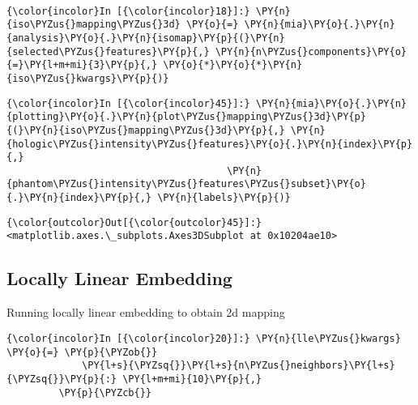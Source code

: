     \begin{center}
    \end{center}
    { \hspace*{\fill} \\}

    \begin{Verbatim}[commandchars=\\\{\}]
{\color{incolor}In [{\color{incolor}18}]:} \PY{n}{iso\PYZus{}mapping\PYZus{}3d} \PY{o}{=} \PY{n}{mia}\PY{o}{.}\PY{n}{analysis}\PY{o}{.}\PY{n}{isomap}\PY{p}{(}\PY{n}{selected\PYZus{}features}\PY{p}{,} \PY{n}{n\PYZus{}components}\PY{o}{=}\PY{l+m+mi}{3}\PY{p}{,} \PY{o}{*}\PY{o}{*}\PY{n}{iso\PYZus{}kwargs}\PY{p}{)}
\end{Verbatim}

    \begin{Verbatim}[commandchars=\\\{\}]
{\color{incolor}In [{\color{incolor}45}]:} \PY{n}{mia}\PY{o}{.}\PY{n}{plotting}\PY{o}{.}\PY{n}{plot\PYZus{}mapping\PYZus{}3d}\PY{p}{(}\PY{n}{iso\PYZus{}mapping\PYZus{}3d}\PY{p}{,} \PY{n}{hologic\PYZus{}intensity\PYZus{}features}\PY{o}{.}\PY{n}{index}\PY{p}{,}
                                      \PY{n}{phantom\PYZus{}intensity\PYZus{}features\PYZus{}subset}\PY{o}{.}\PY{n}{index}\PY{p}{,} \PY{n}{labels}\PY{p}{)}
\end{Verbatim}

            \begin{Verbatim}[commandchars=\\\{\}]
{\color{outcolor}Out[{\color{outcolor}45}]:} <matplotlib.axes.\_subplots.Axes3DSubplot at 0x10204ae10>
\end{Verbatim}

    \subsection{Locally Linear Embedding}\label{locally-linear-embedding}

Running locally linear embedding to obtain 2d mapping

    \begin{Verbatim}[commandchars=\\\{\}]
{\color{incolor}In [{\color{incolor}20}]:} \PY{n}{lle\PYZus{}kwargs} \PY{o}{=} \PY{p}{\PYZob{}}
             \PY{l+s}{\PYZsq{}}\PY{l+s}{n\PYZus{}neighbors}\PY{l+s}{\PYZsq{}}\PY{p}{:} \PY{l+m+mi}{10}\PY{p}{,}
         \PY{p}{\PYZcb{}}
\end{Verbatim}

